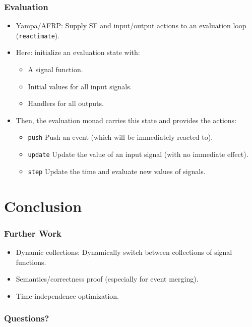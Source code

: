 \documentclass{beamer}
\begin{document}
\begin{frame}
\frametitle{Evaluation}
    \begin{itemize}
        \item Yampa/AFRP: Supply SF and input/output actions to an evaluation loop ({\tt reactimate}).
        \item Here: initialize an evaluation state with:
        \begin{itemize}
            \item A signal function.
            \item Initial values for all input signals.
            \item Handlers for all outputs.
        \end{itemize}
        \item Then, the evaluation monad carries this state and provides the actions:
            \begin{itemize}
                \item {\tt push} Push an event (which will be immediately reacted to).
                \item {\tt update} Update the value of an input signal (with no immediate effect).
                \item {\tt step} Update the time and evaluate new values of signals.
            \end{itemize}
    \end{itemize}
\end{frame}

\section{Conclusion}


\begin{frame}
\frametitle{Further Work}
\begin{itemize}
  \item Dynamic collections: Dynamically switch between collections of signal functions.
  \item Semantics/correctness proof (especially for event merging).
  \item Time-independence optimization.
\end{itemize}
\end{frame}

\begin{frame}
\frametitle{Questions?}
\end{frame}
\end{document}
